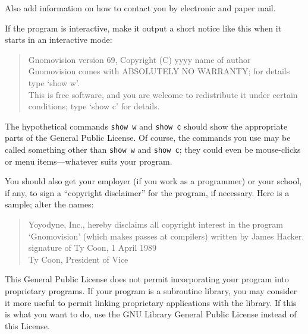 \documentclass{article}
\begin{document}
Also add information on how to contact you by electronic and paper mail.

If the program is interactive, make it output a short notice like this
when it starts in an interactive mode:

\begin{quote}
Gnomovision version 69, Copyright (C) yyyy  name of author \\
Gnomovision comes with ABSOLUTELY NO WARRANTY; for details type `show w'. \\
This is free software, and you are welcome to redistribute it
under certain conditions; type `show c' for details.
\end{quote}


The hypothetical commands {\tt show w} and {\tt show c} should show the
appropriate parts of the General Public License.  Of course, the commands
you use may be called something other than {\tt show w} and {\tt show c};
they could even be mouse-clicks or menu items---whatever suits your
program.

You should also get your employer (if you work as a programmer) or your
school, if any, to sign a ``copyright disclaimer'' for the program, if
necessary.  Here is a sample; alter the names:

\begin{quote}
Yoyodyne, Inc., hereby disclaims all copyright interest in the program \\
`Gnomovision' (which makes passes at compilers) written by James Hacker. \\

signature of Ty Coon, 1 April 1989 \\
Ty Coon, President of Vice
\end{quote}

This General Public License does not permit incorporating your program
into proprietary programs.  If your program is a subroutine library, you
may consider it more useful to permit linking proprietary applications
with the library.  If this is what you want to do, use the GNU Library
General Public License instead of this License.

%
\end{document}
